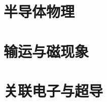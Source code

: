 \newpage

\newpage

\newpage

\newpage


\part{半导体物理}\label{part:semiconductors}\setpartcolor{\value{part}}

\newpage

\newpage


\part{输运与磁现象}\label{part:transport}\setpartcolor{\value{part}}

\newpage


\part{关联电子与超导}\label{part:correlated}\setpartcolor{\value{part}}

\newpage

\newpage


% 


